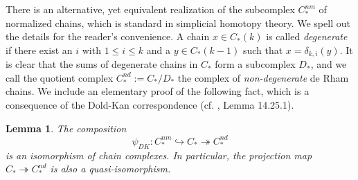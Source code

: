 \documentclass[a4paper]{article}
\newtheorem{lemma}[theorem]{Lemma}
\numberwithin{equation}{section}
\begin{document}
There is an alternative, yet equivalent realization of the subcomplex $C_\ast^\mathit{nm}$ of normalized chains, which is standard in simplicial homotopy theory. We spell out the details for the reader's convenience. A chain $x\in C_\ast(k)$ is called \textit{degenerate} if there exist an $i$ with $1\leq i\leq k$ and a $y\in C_\ast(k-1)$ such that $x=\delta_{k,i}(y)$. It is clear that the sums of degenerate chains in $C_\ast$ form a subcomplex $D_\ast$, and we call the quotient complex $C_\ast^\mathit{nd}:=C_\ast/D_\ast$ the complex of \textit{non-degenerate} de Rham chains. We include an elementary proof of the following fact, which is a consequence of the Dold-Kan correspondence (cf. \cite{stack}, Lemma 14.25.1).

\begin{lemma}\label{lemma:DK}
The composition
\begin{equation}
\psi_{DK}:C_\ast^\mathit{nm}\hookrightarrow C_\ast\twoheadrightarrow C_\ast^\mathit{nd}
\end{equation}
is an isomorphism of chain complexes. In particular, the projection map $C_\ast\twoheadrightarrow C_\ast^\mathit{nd}$ is also a quasi-isomorphism.
\end{lemma}
\end{document}
